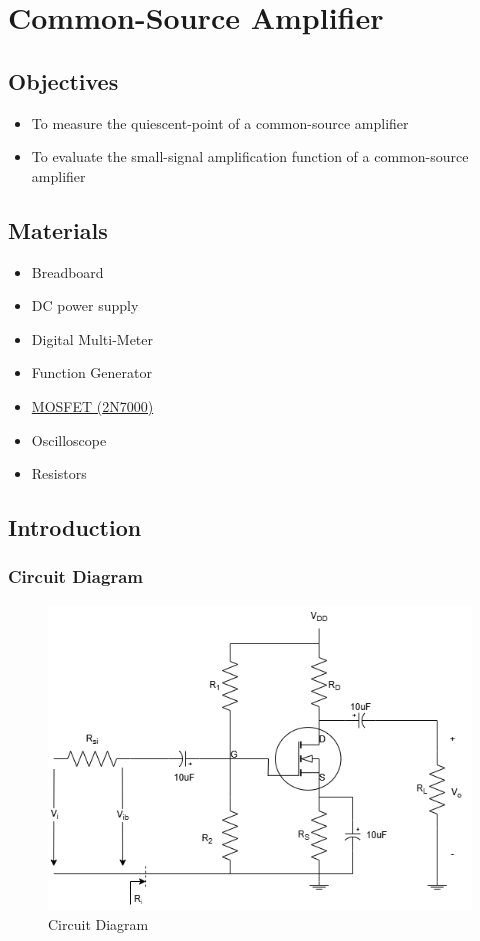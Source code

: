 \chapter{Common-Source Amplifier}


\section{Objectives}
\begin{itemize}
    \item To measure the quiescent-point of a common-source amplifier
    \item To evaluate the small-signal amplification function of a common-source amplifier
\end{itemize}

\section{Materials}
\begin{itemize}
    \item Breadboard
    \item DC power supply
    \item Digital Multi-Meter
    \item Function Generator
    \item \hyperref[2N7000_1]{MOSFET (2N7000)}
    \item Oscilloscope
    \item Resistors
\end{itemize}

\section{Introduction}
    \subsection{Circuit Diagram}
    \begin{figure}[h]
        \centering
        \includegraphics[width=0.65\linewidth]{Lab09/Lab9.drawio.png}
        \caption{Circuit Diagram}
        \label{l9f}
    \end{figure}
    \FloatBarrier


